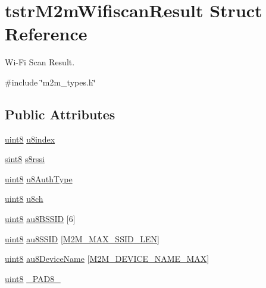 \hypertarget{structtstrM2mWifiscanResult}{}\section{tstr\+M2m\+Wifiscan\+Result Struct Reference}
\label{structtstrM2mWifiscanResult}


Wi-\/\+Fi Scan Result.  




{\ttfamily \#include \char`\"{}m2m\+\_\+types.\+h\char`\"{}}

\subsection*{Public Attributes}
\begin{DoxyCompactItemize}
\item 
\hyperlink{group__DataT_ga4df709a77647e870bbf1d955b8edc9a6}{uint8} \hyperlink{structtstrM2mWifiscanResult_a70c6b917a7693e2afcc8e912e10f1d96}{u8index}
\item 
\hyperlink{group__DataT_gae35f10ffd0ac8dd2bc3e794da9bdfbc7}{sint8} \hyperlink{structtstrM2mWifiscanResult_a34d94f696097c6c569b480fe4262a2cc}{s8rssi}
\item 
\hyperlink{group__DataT_ga4df709a77647e870bbf1d955b8edc9a6}{uint8} \hyperlink{structtstrM2mWifiscanResult_a0b9dbf6b40e1def154c89c53a7ceb381}{u8\+Auth\+Type}
\item 
\hyperlink{group__DataT_ga4df709a77647e870bbf1d955b8edc9a6}{uint8} \hyperlink{structtstrM2mWifiscanResult_a345089f7fa5a6570886c340c08cfeb2e}{u8ch}
\item 
\hyperlink{group__DataT_ga4df709a77647e870bbf1d955b8edc9a6}{uint8} \hyperlink{structtstrM2mWifiscanResult_ae1d4c47f31a39e2423d5c7894022b95c}{au8\+B\+S\+S\+ID} \mbox{[}6\mbox{]}
\item 
\hyperlink{group__DataT_ga4df709a77647e870bbf1d955b8edc9a6}{uint8} \hyperlink{structtstrM2mWifiscanResult_a9636bd1e4481cde0a1523a97a394b185}{au8\+S\+S\+ID} \mbox{[}\hyperlink{group__WlanDefines_gab2bd95c18ede2fbc07b44c5660cc0097}{M2\+M\+\_\+\+M\+A\+X\+\_\+\+S\+S\+I\+D\+\_\+\+L\+EN}\mbox{]}
\item 
\hyperlink{group__DataT_ga4df709a77647e870bbf1d955b8edc9a6}{uint8} \hyperlink{structtstrM2mWifiscanResult_a7fdc1783d18cb6c57d17cc73cf0c171f}{au8\+Device\+Name} \mbox{[}\hyperlink{group__WlanDefines_ga13694b7fb6c7afefab58c38a43aa1957}{M2\+M\+\_\+\+D\+E\+V\+I\+C\+E\+\_\+\+N\+A\+M\+E\+\_\+\+M\+AX}\mbox{]}
\item 
\hyperlink{group__DataT_ga4df709a77647e870bbf1d955b8edc9a6}{uint8} \hyperlink{structtstrM2mWifiscanResult_ac65cfd7be1189c22e3dc92c3824ab552}{\+\_\+\+P\+A\+D8\+\_\+}
\end{DoxyCompactItemize}


